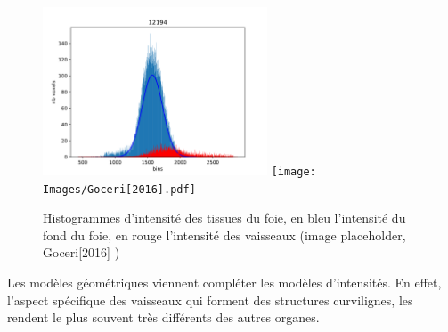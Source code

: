\begin{figure}
  \centering
  \includegraphics[height=5cm]{Images/distribution_vesselsIntensity_mri.pdf}
  \texttt{[image: Images/Goceri[2016].pdf]}
  \label{fig:overlap_vessels_tissues}
  \caption{Histogrammes d'intensité des tissues du foie, en bleu l'intensité du fond du foie, en rouge l'intensité des vaisseaux (image placeholder, Goceri[2016] ) }
\end{figure}

Les modèles géométriques viennent compléter les modèles d'intensités. En effet, l'aspect spécifique des vaisseaux qui forment des structures curvilignes, les rendent le plus souvent très différents des autres organes.

